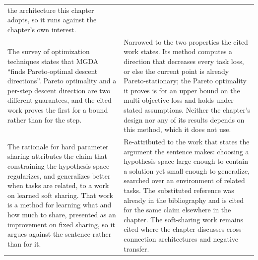 {\begin{longtable}{@{}p{}p{}@{}}
the architecture this chapter adopts, so it runs against the chapter's own interest. \\
\addlinespace
The survey of optimization techniques states that MGDA ``finds Pareto-optimal descent
directions''. Pareto optimality and a per-step descent direction are two different
guarantees, and the cited work proves the first for a bound rather than for the step. &
Narrowed to the two properties the cited work states. Its method computes a direction that
decreases every task loss, or else the current point is already Pareto-stationary; the Pareto
optimality it proves is for an upper bound on the multi-objective loss and holds under stated
assumptions. Neither the chapter's design nor any of its results depends on this method, which
it does not use. \\
\addlinespace
The rationale for hard parameter sharing attributes the claim that constraining the
hypothesis space regularizes, and generalizes better when tasks are related, to a work on
learned soft sharing. That work is a method for learning what and how much to share,
presented as an improvement on fixed sharing, so it argues against the sentence rather than
for it. &
Re-attributed to the work that states the argument the sentence makes: choosing a hypothesis
space large enough to contain a solution yet small enough to generalize, searched over an
environment of related tasks. The substituted reference was already in the bibliography and
is cited for the same claim elsewhere in the chapter. The soft-sharing work remains cited
where the chapter discusses cross-connection architectures and negative transfer. \\
\end{longtable}
}

